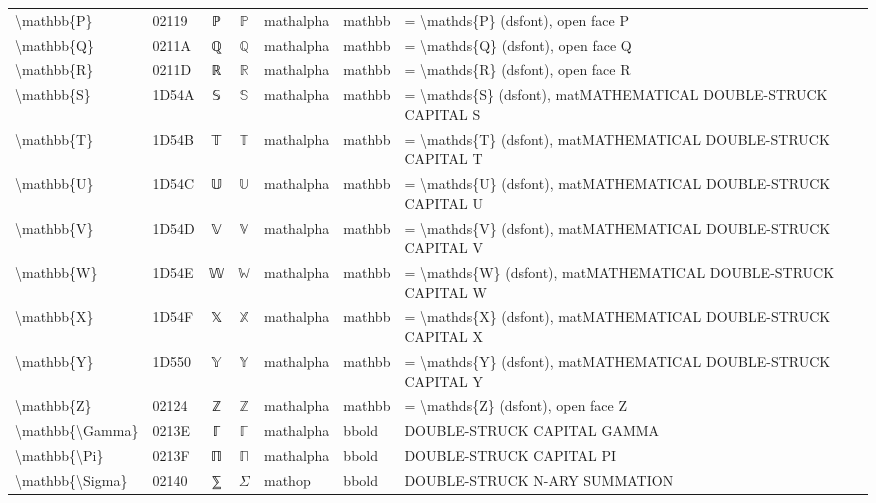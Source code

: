 \documentclass[a4paper,landscape]{article}
\begin{document}
\begin{longtable}{llcclll}
\textbackslash{}mathbb\{P\} & 02119 & ℙ & $\mathbb{P}$ & mathalpha & mathbb & = \textbackslash{}mathds\{P\} (dsfont), open face P \\
\textbackslash{}mathbb\{Q\} & 0211A & ℚ & $\mathbb{Q}$ & mathalpha & mathbb & = \textbackslash{}mathds\{Q\} (dsfont), open face Q \\
\textbackslash{}mathbb\{R\} & 0211D & ℝ & $\mathbb{R}$ & mathalpha & mathbb & = \textbackslash{}mathds\{R\} (dsfont), open face R \\
\textbackslash{}mathbb\{S\} & 1D54A & 𝕊 & $\mathbb{S}$ & mathalpha & mathbb & = \textbackslash{}mathds\{S\} (dsfont), matMATHEMATICAL DOUBLE-STRUCK CAPITAL S \\
\textbackslash{}mathbb\{T\} & 1D54B & 𝕋 & $\mathbb{T}$ & mathalpha & mathbb & = \textbackslash{}mathds\{T\} (dsfont), matMATHEMATICAL DOUBLE-STRUCK CAPITAL T \\
\textbackslash{}mathbb\{U\} & 1D54C & 𝕌 & $\mathbb{U}$ & mathalpha & mathbb & = \textbackslash{}mathds\{U\} (dsfont), matMATHEMATICAL DOUBLE-STRUCK CAPITAL U \\
\textbackslash{}mathbb\{V\} & 1D54D & 𝕍 & $\mathbb{V}$ & mathalpha & mathbb & = \textbackslash{}mathds\{V\} (dsfont), matMATHEMATICAL DOUBLE-STRUCK CAPITAL V \\
\textbackslash{}mathbb\{W\} & 1D54E & 𝕎 & $\mathbb{W}$ & mathalpha & mathbb & = \textbackslash{}mathds\{W\} (dsfont), matMATHEMATICAL DOUBLE-STRUCK CAPITAL W \\
\textbackslash{}mathbb\{X\} & 1D54F & 𝕏 & $\mathbb{X}$ & mathalpha & mathbb & = \textbackslash{}mathds\{X\} (dsfont), matMATHEMATICAL DOUBLE-STRUCK CAPITAL X \\
\textbackslash{}mathbb\{Y\} & 1D550 & 𝕐 & $\mathbb{Y}$ & mathalpha & mathbb & = \textbackslash{}mathds\{Y\} (dsfont), matMATHEMATICAL DOUBLE-STRUCK CAPITAL Y \\
\textbackslash{}mathbb\{Z\} & 02124 & ℤ & $\mathbb{Z}$ & mathalpha & mathbb & = \textbackslash{}mathds\{Z\} (dsfont), open face Z \\
\textbackslash{}mathbb\{\textbackslash{}Gamma\} & 0213E & ℾ & $\mathbb{\Gamma}$ & mathalpha & bbold & DOUBLE-STRUCK CAPITAL GAMMA \\
\textbackslash{}mathbb\{\textbackslash{}Pi\} & 0213F & ℿ & $\mathbb{\Pi}$ & mathalpha & bbold & DOUBLE-STRUCK CAPITAL PI \\
\textbackslash{}mathbb\{\textbackslash{}Sigma\} & 02140 & ⅀ & $\mathbb{\Sigma}$ & mathop & bbold & DOUBLE-STRUCK N-ARY SUMMATION \\

\end{longtable}
\end{document}
